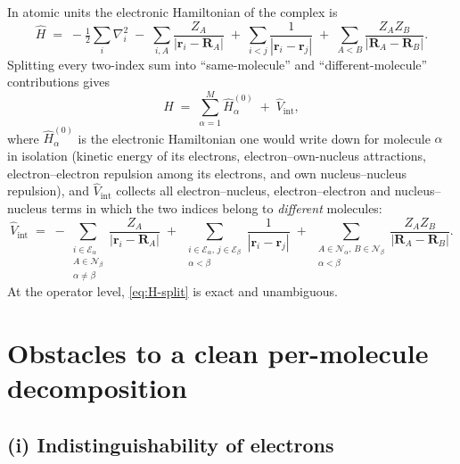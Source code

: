 \documentclass[11pt,a4paper]{article}
\newcommand{\Hop}{\hat{H}}
\newcommand{\Vop}{\hat{V}}
\begin{document}
In atomic units the electronic Hamiltonian of the complex is
\begin{equation}
\Hop \;=\; -\tfrac12 \sum_{i} \nabla_i^2
\;-\; \sum_{i,A} \frac{Z_A}{|\mathbf{r}_i - \mathbf{R}_A|}
\;+\; \sum_{i<j} \frac{1}{|\mathbf{r}_i - \mathbf{r}_j|}
\;+\; \sum_{A<B} \frac{Z_A Z_B}{|\mathbf{R}_A - \mathbf{R}_B|}.
\label{eq:H-full}
\end{equation}
Splitting every two-index sum into ``same-molecule'' and ``different-molecule''
contributions gives
\begin{equation}
\Hop \;=\; \sum_{\alpha=1}^{M} \Hop_\alpha^{(0)} \;+\; \Vop_{\mathrm{int}},
\label{eq:H-split}
\end{equation}
where $\Hop_\alpha^{(0)}$ is the electronic Hamiltonian one would write down for
molecule $\alpha$ in isolation (kinetic energy of its electrons, electron--own-nucleus
attractions, electron--electron repulsion among its electrons, and own
nucleus--nucleus repulsion), and $\Vop_{\mathrm{int}}$ collects all
electron--nucleus, electron--electron and nucleus--nucleus terms in which the
two indices belong to \emph{different} molecules:
\begin{equation}
\Vop_{\mathrm{int}}
\;=\; -\!\!\sum_{\substack{i \in \mathcal{E}_\alpha \\ A \in \mathcal{N}_\beta \\ \alpha \ne \beta}}
        \!\!\frac{Z_A}{|\mathbf{r}_i - \mathbf{R}_A|}
\;+\; \sum_{\substack{i \in \mathcal{E}_\alpha,\, j \in \mathcal{E}_\beta \\ \alpha < \beta}}
        \frac{1}{|\mathbf{r}_i - \mathbf{r}_j|}
\;+\; \sum_{\substack{A \in \mathcal{N}_\alpha,\, B \in \mathcal{N}_\beta \\ \alpha < \beta}}
        \frac{Z_A Z_B}{|\mathbf{R}_A - \mathbf{R}_B|}.
\label{eq:V-int}
\end{equation}
At the operator level, \cref{eq:H-split} is exact and unambiguous.

\section{Obstacles to a clean per-molecule decomposition}
\label{sec:obstacles}

\subsection*{(i) Indistinguishability of electrons}
\end{document}
